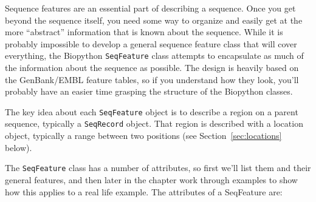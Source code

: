Sequence features are an essential part of describing a sequence. Once you get beyond the sequence itself, you need some way to organize and easily get at the more ``abstract'' information that is known about the sequence. While it is probably impossible to develop a general sequence feature class that will cover everything, the Biopython \verb|SeqFeature| class attempts to encapsulate as much of the information about the sequence as possible. The design is heavily based on the GenBank/EMBL feature tables, so if you understand how they look, you'll probably have an easier time grasping the structure of the Biopython classes.

The key idea about each \verb|SeqFeature| object is to describe a region on a parent sequence, typically a \verb|SeqRecord| object. That region is described with a location object, typically a range between two positions (see Section~\ref{sec:locations} below).

The \verb|SeqFeature| class has a number of attributes, so first we'll list them and their general features, and then later in the chapter work through examples to show how this applies to a real life example. The attributes of a SeqFeature are:

